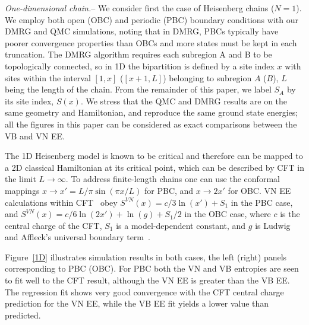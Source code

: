 \documentclass[prl,aps,twocolumn,floatfix,amsmath,amssymb,superscriptaddress,tightenlines]{revtex4}
\begin{document}
{\it One-dimensional chain.}-- We consider first the case of Heisenberg
chains ($N=1$). We employ both open (OBC) and periodic (PBC) boundary conditions
with our DMRG and QMC simulations, noting that in DMRG, PBCs typically
have poorer convergence properties than OBCs and more states must be kept
in each truncation.  The DMRG algorithm requires each subregion A and B to
be topologically connected, so in 1D the bipartition is defined by a site
index $x$ with sites within the interval $[1,x]$ ($[x+1,L]$) belonging to
subregion $A$ ($B$), $L$ being the length of the chain.  From the
remainder of this paper, we label $S_A$ by its site index, $S(x)$.
We stress that the QMC and DMRG results are on the same geometry and
Hamiltonian, and reproduce the same ground state energies; all the figures
in this paper can be considered as exact comparisons between the VB and VN
EE. 

The 1D Heisenberg model is known to be critical and therefore can be
mapped to a 2D classical Hamiltonian at its critical point, which
can be described by CFT in the limit $L\to\infty$.  To address
finite-length chains one can use the conformal mappings $x\to x'=L/\pi
\sin(\pi x / L)$ for PBC, and 
$x\to 2x'$ for OBC. VN
EE calculations within CFT~\cite{Cardy, Huanq2006} obey $S^{VN}(x)= c/3
\ln(x') + S_1$ in the PBC case, and $S^{VN}(x)= c/6 \ln(2x') +
\ln(g)+S_1/2$ in the OBC case, where $c$ is the central charge of the CFT,
$S_1$ is a model-dependent constant, and $g$ is Ludwig and Affleck's
universal boundary term~\cite{AffleckAndLudwig}.

Figure~\ref{1D} illustrates simulation results in both cases, the left
(right) panels corresponding to PBC (OBC). 
For PBC both
the VN and VB entropies are seen to fit well to the CFT result, although
the VN EE is greater than the VB EE. The regression fit shows very good
convergence with the CFT central charge prediction for the VN EE, while
the VB EE fit yields a lower value than predicted.  
\end{document}
